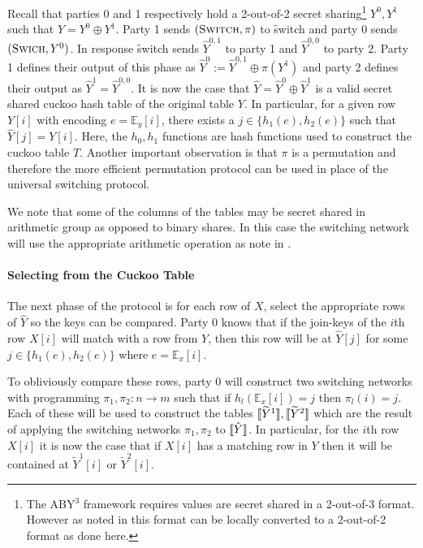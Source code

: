 Recall that parties 0 and 1 respectively hold a 2-out-of-2 secret sharing\footnote{The ABY$^3$ framework requires values are secret shared in a 2-out-of-3 format. However as noted in  this format can be locally converted to a 2-out-of-2 format as done here. } $Y^0,Y^1$ such that $Y=Y^0\oplus Y^1$. 
Party 1 sends $(\textsc{Switch}, \pi)$ to \f{switch} and party 0 sends $(\textsc{Swich}, Y^0)$.%
In response \f{switch} sends $\hat Y^{0,1}$ to party 1  and $\hat Y^{0,0}$ to party 2. Party 1 defines their output of this phase as $\hat Y^0:=\hat Y^{0,1} \oplus \pi(Y^1)$ and party 2 defines their output as $\hat Y^{1} =\hat Y^{0,0}$.
It is now the case that $\hat Y = \hat Y^0\oplus \hat Y^1$ is a valid secret shared cuckoo hash table of the original table $Y$.
\iffullversion
 In particular, for a given row $Y[i]$ with encoding $e=\mathbb{E}_y[i]$, there exists a $j\in \{h_1(e),h_2(e)\}$ such that  $\hat Y[j] = Y[i]$. Here, the $h_0,h_1$ functions are hash functions used to construct the cuckoo table $T$. Another important observation is that $\pi$ is a permutation and therefore the more efficient permutation protocol can be used in place of the universal switching protocol.

We note that some of the columns of the tables may be secret shared in arithmetic group as opposed to binary shares. In this case the switching network will use the appropriate arithmetic operation as note in . 
\fi

\paragraph{Selecting from the Cuckoo Table}

The next phase of the protocol is for each row of $X$, select the appropriate rows of $\hat Y$ so the keys can be compared. Party 0 knows that if the join-keys of the $i$th row $X[i]$ will match with a row from $Y$, then this row will be at $\hat Y[j]$ for some $j\in \{h_1(e),h_2(e)\}$ where  $e=\mathbb{E}_x[i]$. 

To obliviously compare these rows, party 0 will construct two switching networks with programming $\pi_1,\pi_2 : n\rightarrow m$ such that if $h_l(\mathbb{E}_x[i])=j$ then $\pi_l(i)=j$. Each of these will be used to construct the tables $\llbracket \widetilde{Y}^1\rrbracket,\llbracket \widetilde{Y}^2\rrbracket$ which are the result of applying the switching networks $\pi_1,\pi_2$ to $\llbracket \hat Y\rrbracket$. 
\iffullversion
In particular, for the $i$th row $X[i]$ it is now the case that if $X[i]$ has a matching row in $Y$ then it will be contained at  $\widetilde{Y}^1[i]$ or $\widetilde{Y}^2[i]$. 
\fi


